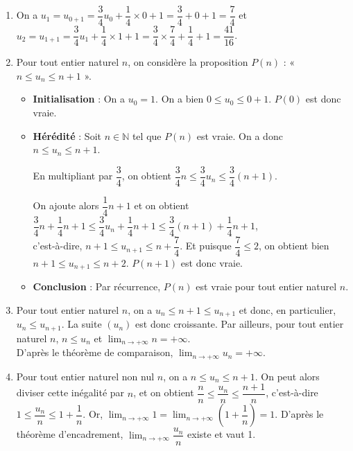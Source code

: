 \documentclass[11pt,fleqn, openany]{book} %
\begin{document}
\begin{solution}\hspace{0pt}
\begin{enumerate}
\item On a $u_1=u_{0+1}=\dfrac{3}{4}u_0+\dfrac{1}{4} \times 0 +1 = \dfrac{3}{4}+0+1=\dfrac{7}{4}$ et \\
 $u_2=u_{1+1}=\dfrac{3}{4}u_1+\dfrac{1}{4} \times 1 +1 = \dfrac{3}{4} \times \dfrac{7}{4}+\dfrac{1}{4}+1=\dfrac{41}{16}$.

\item Pour tout entier naturel $n$, on considère la proposition $P(n)$ : « $n \leqslant u_n \leqslant n+1$ ».

\begin{itemize}
\item \textbf{Initialisation} : On a $u_0 = 1$. On a bien $0 \leqslant u_0 \leqslant 0+1$. $P(0)$ est donc vraie.
\item \textbf{Hérédité} : Soit $n\in\mathbb{N}$ tel que $P(n)$ est vraie. On a donc $n \leqslant u_n \leqslant n+1$. 

En multipliant par $\dfrac{3}{4}$, on obtient $\dfrac{3}{4}n \leqslant \dfrac{3}{4}u_n \leqslant  \dfrac{3}{4}(n+1)$.

On ajoute alors $\dfrac{1}{4}n+1$ et on obtient $\dfrac{3}{4}n + \dfrac{1}{4}n+1 \leqslant \dfrac{3}{4}u_n +\dfrac{1}{4}n+1\leqslant  \dfrac{3}{4}(n+1)+\dfrac{1}{4}n+1$, \\ c'est-à-dire, $n+1 \leqslant u_{n+1} \leqslant n + \dfrac{7}{4}$.
Et puisque $\dfrac{7}{4}\leqslant 2$, on obtient bien $n+1 \leqslant u_{n+1} \leqslant n + 2$. $P(n+1)$ est donc vraie.
\item \textbf{Conclusion} : Par récurrence, $P(n)$ est vraie pour tout entier naturel $n$.
\end{itemize}

\item Pour tout entier naturel $n$, on a $u_n \leqslant n+1 \leqslant u_{n+1}$ et donc, en particulier, $u_n \leqslant u_{n+1}$. La suite $(u_n)$ est donc croissante. Par ailleurs, pour tout entier naturel $n$, $n \leqslant u_n$ et $\displaystyle \lim _{n \to + \infty}n=+\infty$. \\ D'après le théorème de comparaison, $\displaystyle \lim _{n \to + \infty} u _n = +\infty$.

\item Pour tout entier naturel non nul $n$, on a $n \leqslant u_n \leqslant n+1$. On peut alors diviser cette inégalité par $n$, et on obtient $\dfrac{n}{n} \leqslant \dfrac{u_n}{n} \leqslant \dfrac{n+1}{n}$, c'est-à-dire $1 \leqslant \dfrac{u_n}{n} \leqslant 1+ \dfrac{1}{n}$. Or, $\displaystyle \lim _{n \to + \infty} 1=\displaystyle \lim _{n \to + \infty}\left(1+\dfrac{1}{n}\right)=1$. D'après le théorème d'encadrement, $\displaystyle \lim _{n \to + \infty}\dfrac{u_n}{n}$ existe et vaut 1.\end{enumerate}
\end{solution}
\end{document}
